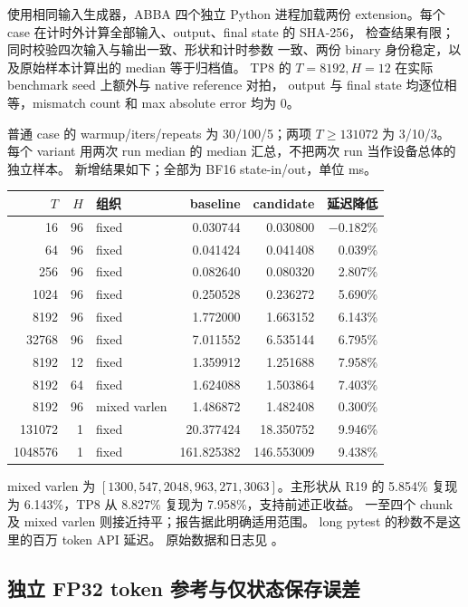  使用相同输入生成器，ABBA 四个独立 Python 进程加载两份
extension。每个 case 在计时外计算全部输入、output、final state 的 SHA-256，
检查结果有限； 同时校验四次输入与输出一致、形状和计时参数
一致、两份 binary 身份稳定，以及原始样本计算出的 median 等于归档值。
TP8 的 $T=8192,H=12$ 在实际 benchmark seed 上额外与 native reference 对拍，
output 与 final state 均逐位相等，mismatch count 和 max absolute error 均为 0。

普通 case 的 warmup/iters/repeats 为 30/100/5；两项 $T\ge131072$ 为 3/10/3。
每个 variant 用两次 run median 的 median 汇总，不把两次 run 当作设备总体的独立样本。
新增结果如下；全部为 BF16 state-in/out，单位 ms。

\begin{center}\small
\begin{tabular}{@{}rrlrrr@{}}\toprule
$T$&$H$&组织&baseline&candidate&延迟降低\\\midrule
16&96&fixed&0.030744&0.030800&$-0.182\%$\\
64&96&fixed&0.041424&0.041408&0.039\%\\
256&96&fixed&0.082640&0.080320&2.807\%\\
1024&96&fixed&0.250528&0.236272&5.690\%\\
8192&96&fixed&1.772000&1.663152&6.143\%\\
32768&96&fixed&7.011552&6.535144&6.795\%\\
8192&12&fixed&1.359912&1.251688&7.958\%\\
8192&64&fixed&1.624088&1.503864&7.403\%\\
8192&96&mixed varlen&1.486872&1.482408&0.300\%\\
131072&1&fixed&20.377424&18.350752&9.946\%\\
1048576&1&fixed&161.825382&146.553009&9.438\%\\\bottomrule
\end{tabular}
\end{center}

mixed varlen 为 $[1300,547,2048,963,271,3063]$。主形状从 R19 的 5.854\%
复现为 6.143\%，TP8 从 8.827\% 复现为 7.958\%，支持前述正收益。
一至四个 chunk 及 mixed varlen 则接近持平；报告据此明确适用范围。
long pytest 的秒数不是这里的百万 token API 延迟。
原始数据和日志见 。

\subsection{独立 FP32 token 参考与仅状态保存误差}

